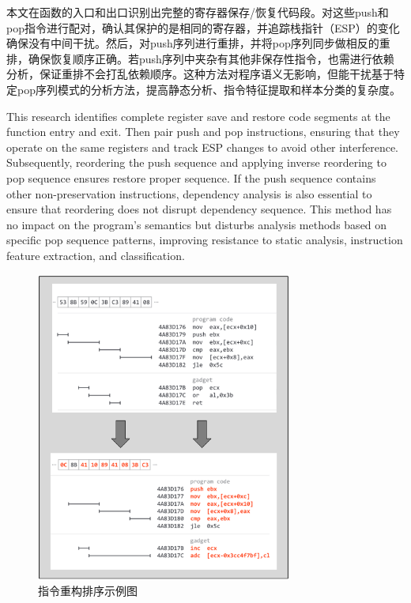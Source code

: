 本文在函数的入口和出口识别出完整的寄存器保存/恢复代码段。对这些push和pop指令进行配对，确认其保护的是相同的寄存器，并追踪栈指针（ESP）的变化确保没有中间干扰。然后，对push序列进行重排，并将pop序列同步做相反的重排，确保恢复顺序正确。若push序列中夹杂有其他非保存性指令，也需进行依赖分析，保证重排不会打乱依赖顺序。这种方法对程序语义无影响，但能干扰基于特定pop序列模式的分析方法，提高静态分析、指令特征提取和样本分类的复杂度。

This research identifies complete register save and restore code segments at the function entry and exit. Then pair push and pop instructions, ensuring that they operate on the same registers and track ESP changes to avoid other interference. Subsequently, reordering the push sequence and applying inverse reordering to pop sequence ensures restore proper sequence. If the push sequence contains other non-preservation instructions, dependency analysis is also essential to ensure that reordering does not disrupt dependency sequence. This method has no impact on the program's semantics but disturbs analysis methods based on specific pop sequence patterns, improving resistance to static analysis, instruction feature extraction, and classification.

\begin{figure}[hbt]
	\centering
	\includegraphics[width=0.75\textwidth]{figures/4.3}
	\caption{指令重构排序示例图}\label{fig:4.3}
\end{figure}

